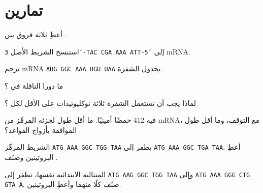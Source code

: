 \section{تمارين}

\begin{exercise}[$\star$]\label{exo:g11:gene-expression:1}
أعطِ ثلاثة فروق بين  .
\end{exercise}

\begin{exercise}[$\star$]\label{exo:g11:gene-expression:2}
استنسخ الشريط الأصل \texttt{3'-TAC CGA AAA ATT-5'} إلى mRNA.
\end{exercise}

\begin{exercise}[$\star$]\label{exo:g11:gene-expression:3}
ترجم mRNA \texttt{AUG GGC AAA UGU UAA} بجدول الشفرة.
\end{exercise}

\begin{exercise}[$\star$]\label{exo:g11:gene-expression:4}
ما دورا   الناقلة في ؟
\end{exercise}

\begin{exercise}[$\star$]\label{exo:g11:gene-expression:5}
لماذا يجب أن تستعمل الشفرة ثلاثة نوكليوتيدات على الأقل لكل ؟
\end{exercise}

\begin{exercise}[$\star\star$]\label{exo:g11:gene-expression:6}
 فيه 412 حمضًا أمينيًا. ما أقل طول لجزئه المرمِّز من mRNA، مع
 التوقف، وما أقل طول  الموافقة بأزواج القواعد؟
\end{exercise}

\begin{exercise}[$\star\star$]\label{exo:g11:gene-expression:7}
الشريط المرمِّز \texttt{ATG AAA GGC TGG TAA} يطفر إلى
\texttt{ATG AAA GGC TGA TAA}. أعطِ البروتينين وصنّف .
\end{exercise}

\begin{exercise}[$\star\star$]\label{exo:g11:gene-expression:8}
المتتالية الابتدائية نفسها، تطفر إلى \texttt{ATG AAG GGC TGG TAA} وإلى
\texttt{ATG AAA GGG CTG GTA A}. صنّف كلًا منهما وأعطِ البروتينين.
\end{exercise}

